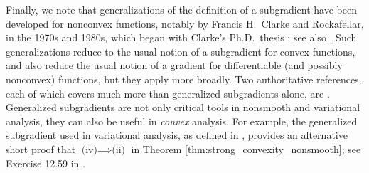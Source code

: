 Finally, we note that generalizations of the definition of a subgradient have
been developed for nonconvex functions, notably by Francis H.\ Clarke and
Rockafellar, in the 1970s and 1980s, which began with Clarke's Ph.D.\    
thesis \cite{clarke1973necessary}; see also \cite{clarke1975generalized, 
  rockafellar1979directionally, rockafellar1980generalized}. Such
generalizations reduce to the usual notion of a subgradient for convex
functions, and also reduce the usual notion of a gradient for differentiable
(and possibly nonconvex) functions, but they apply more broadly. Two
authoritative references, each of which covers much more than generalized
subgradients alone, are \cite{clarke1990optimization,
rockafellar2009variational}.  Generalized subgradients are not only critical
tools in nonsmooth and variational analysis, they can also be useful in
\emph{convex} analysis. For example, the generalized subgradient used in
variational analysis, as defined in \cite{rockafellar2009variational}, provides
an alternative short proof that $\text{(iv)} \implies \text{(ii)}$ in Theorem
\ref{thm:strong_convexity_nonsmooth}; see Exercise 12.59 in
\cite{rockafellar2009variational}.

\clearpage

